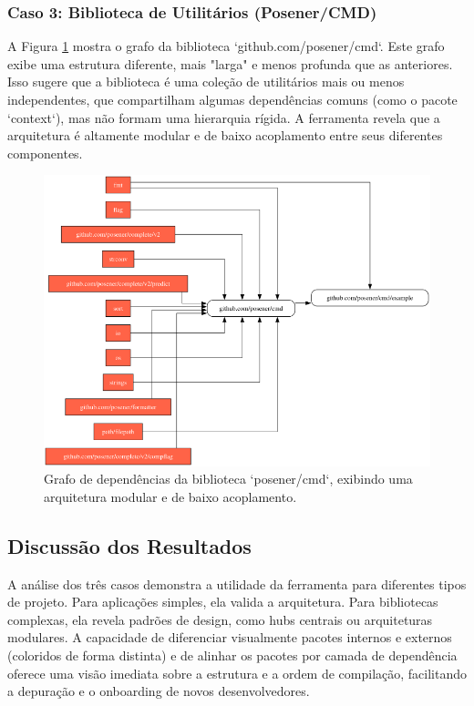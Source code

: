 \documentclass[12pt]{article}
\begin{document}
\FloatBarrier

\subsubsection{Caso 3: Biblioteca de Utilitários (Posener/CMD)}
A Figura \ref{fig:exemplo-3} mostra o grafo da biblioteca `github.com/posener/cmd`. Este grafo exibe uma estrutura diferente, mais "larga" e menos profunda que as anteriores. Isso sugere que a biblioteca é uma coleção de utilitários mais ou menos independentes, que compartilham algumas dependências comuns (como o pacote `context`), mas não formam uma hierarquia rígida. A ferramenta revela que a arquitetura é altamente modular e de baixo acoplamento entre seus diferentes componentes.

\begin{figure}[htbp]
\centering
\includegraphics[width=.6\textwidth]{examples/github.com_posener_cmd.png}
\caption{Grafo de dependências da biblioteca `posener/cmd`, exibindo uma arquitetura modular e de baixo acoplamento.}
\label{fig:exemplo-3}
\end{figure}

\FloatBarrier

\subsection{Discussão dos Resultados}
A análise dos três casos demonstra a utilidade da ferramenta para diferentes tipos de projeto. Para aplicações simples, ela valida a arquitetura. Para bibliotecas complexas, ela revela padrões de design, como hubs centrais ou arquiteturas modulares. A capacidade de diferenciar visualmente pacotes internos e externos (coloridos de forma distinta) e de alinhar os pacotes por camada de dependência oferece uma visão imediata sobre a estrutura e a ordem de compilação, facilitando a depuração e o onboarding de novos desenvolvedores.
\end{document}
